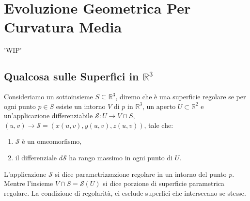 \chapter{Evoluzione Geometrica Per Curvatura Media}
'WIP'
%
%
\section{Qualcosa sulle Superfici in $\mathbb{R}^3$}

Consideriamo un sottoinsieme $S\subseteq\mathbb{R}^3$, diremo che è una superficie regolare se per ogni punto $p\in S$ esiste un intorno $V$ di $p$ in $\mathbb{R}^3$, un aperto $U\subset\mathbb{R}^2$ e un'applicazione differenziabile $\mathcal{S}:U\longrightarrow V\cap S$,$(u,v)\longrightarrow\mathcal{S}=(x(u,v),y(u,v),z(u,v))$, tale che:
\begin{enumerate}
  \item $\mathcal{S}$ è un omeomorfismo,
  \item il differenziale $d\mathcal{S}$ ha rango massimo in ogni punto di $U$.
\end{enumerate}
L'applicazione $\mathcal{S}$ si dice parametrizzazione regolare in un intorno del punto $p$. Mentre l'insieme $V\cap S=\mathcal{S}(U)$ si dice porzione di superficie parametrica regolare. La condizione di regolarità, ci esclude superfici che intersecano se stesse.

